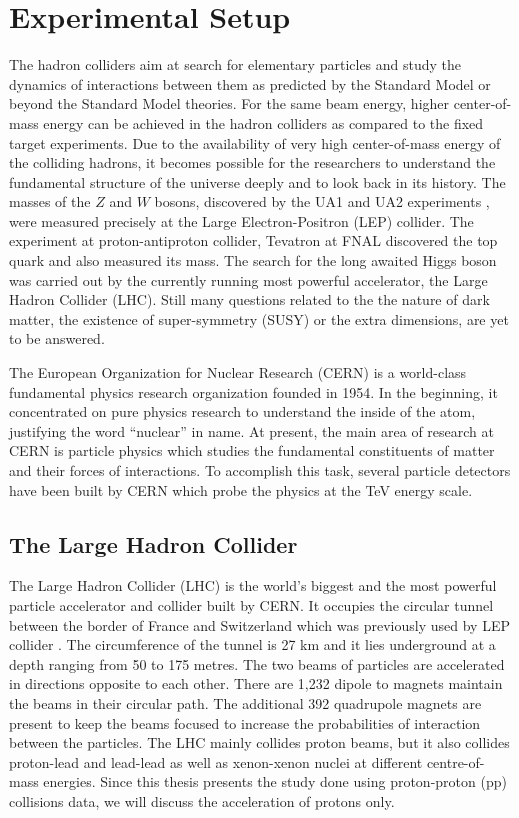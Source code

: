 \chapter{Experimental Setup}
\label{chap:Detector}
The hadron colliders aim at search for elementary particles and study the dynamics of interactions between them as predicted by the Standard Model or beyond the Standard Model theories. For the same beam energy, higher center-of-mass energy can be achieved in the hadron colliders as compared to the fixed target experiments. Due to the availability of very high center-of-mass energy of the colliding hadrons, it becomes possible for the researchers to understand the fundamental structure of the universe deeply and to look back in its history. The masses of the $Z$ and $W$ bosons, discovered by the UA1 and UA2 experiments \cite{Arnison:1983rp,Banner:1983jy}, were measured precisely at the Large Electron-Positron (LEP) collider. The experiment at proton-antiproton collider, Tevatron at FNAL discovered the top quark and also measured its mass. The search for the long awaited Higgs boson was carried out by the currently running most powerful accelerator, the Large Hadron Collider (LHC). Still many questions related to the the nature of dark matter, the existence of super-symmetry (SUSY) or the extra dimensions, are yet to be answered. 

The European Organization for Nuclear Research (CERN) is a world-class fundamental physics research organization founded in 1954. In the beginning, it concentrated on pure physics research to understand the inside of the atom, justifying the word ``nuclear'' in name. At present, the main area of research at CERN is particle physics which studies the fundamental constituents of matter and their forces of interactions. To accomplish this task, several particle detectors have been built by CERN which probe the physics at the TeV energy scale.

\section{The Large Hadron Collider}
The Large Hadron Collider (LHC) \cite{Evans:2008zzb} is the world's biggest and the most powerful particle accelerator and collider built by CERN. It occupies the circular tunnel between the border of France and Switzerland which was previously used by LEP collider \cite{LEP}. The circumference of the tunnel is 27 km and it lies underground at a depth ranging from 50 to 175 metres. The two beams of particles are accelerated in directions opposite to each other. There are 1,232 dipole to magnets maintain the beams in their circular path. The additional 392 quadrupole magnets are present to keep the beams focused to increase the probabilities of interaction between the particles. The LHC mainly collides proton beams, but it also collides proton-lead and lead-lead as well as xenon-xenon nuclei at different centre-of-mass energies. Since this thesis presents the study done using proton-proton (pp) collisions data, we will discuss the acceleration of protons only. 

